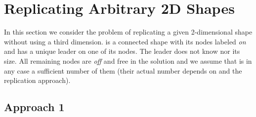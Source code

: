 \documentclass[oribibl, 11pt]{llncs}
\begin{document}
\section{Replicating Arbitrary 2D Shapes}
\label{sec:replication}

In this section we consider the problem of replicating a given 2-dimensional shape  without using a third dimension.  is a connected shape with its nodes labeled \emph{on} and has a unique leader on one of its nodes. The leader does not know  nor its size. All remaining nodes are \emph{off} and free in the solution and we assume that is in any case a sufficient number of them (their actual number depends on  and the replication approach).

\subsection{Approach 1}
\end{document}
